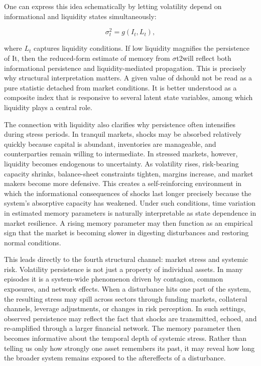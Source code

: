 \documentclass[12pt]{article}
\begin{document}
One can express this idea schematically by letting volatility depend on informational and liquidity states simultaneously:

\[\sigma_t^2 = g(I_t, L_t),\]

where $L_t$ captures liquidity conditions. If low liquidity magnifies the persistence of It, then the reduced-form estimate of memory from $\sigma$t2will reflect both informational persistence and liquidity-mediated propagation. This is precisely why structural interpretation matters. A given value of dshould not be read as a pure statistic detached from market conditions. It is better understood as a composite index that is responsive to several latent state variables, among which liquidity plays a central role.

The connection with liquidity also clarifies why persistence often intensifies during stress periods. In tranquil markets, shocks may be absorbed relatively quickly because capital is abundant, inventories are manageable, and counterparties remain willing to intermediate. In stressed markets, however, liquidity becomes endogenous to uncertainty. As volatility rises, risk-bearing capacity shrinks, balance-sheet constraints tighten, margins increase, and market makers become more defensive. This creates a self-reinforcing environment in which the informational consequences of shocks last longer precisely because the system's absorptive capacity has weakened. Under such conditions, time variation in estimated memory parameters is naturally interpretable as state dependence in market resilience. A rising memory parameter may then function as an empirical sign that the market is becoming slower in digesting disturbances and restoring normal conditions.

This leads directly to the fourth structural channel: market stress and systemic risk. Volatility persistence is not just a property of individual assets. In many episodes it is a system-wide phenomenon driven by contagion, common exposures, and network effects. When a disturbance hits one part of the system, the resulting stress may spill across sectors through funding markets, collateral channels, leverage adjustments, or changes in risk perception. In such settings, observed persistence may reflect the fact that shocks are transmitted, echoed, and re-amplified through a larger financial network. The memory parameter then becomes informative about the temporal depth of systemic stress. Rather than telling us only how strongly one asset remembers its past, it may reveal how long the broader system remains exposed to the aftereffects of a disturbance.
\end{document}
